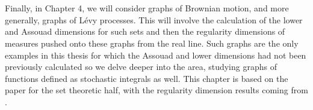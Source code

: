 \\ \\
Finally, in Chapter 4, we will consider graphs of Brownian motion, and more generally, graphs of L\'evy processes. This will involve the calculation of the lower and Assouad dimensions for such sets and then the regularity dimensions of measures pushed onto these graphs from the real line. Such graphs are the only examples in this thesis for which the Assouad and lower dimensions had not been previously calculated so we delve deeper into the area, studying graphs of functions defined as stochastic integrals as well. This chapter is based on the paper \cite{howroyd-yu} for the set theoretic half, with the regularity dimension results coming from \cite{howroyd}.

